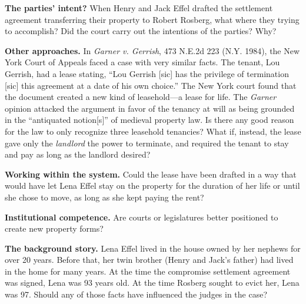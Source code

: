 
\item \textbf{The parties' intent?} When Henry and Jack Effel drafted the
settlement agreement transferring their property to Robert Rosberg, what where
they trying to accomplish?  Did the court carry out the intentions of the
parties?  Why?


\item \textbf{Other approaches.} In \textit{Garner v. Gerrish}, 473 N.E.2d 223
(N.Y. 1984), the New York Court of Appeals faced a case with very similar
facts.  The tenant, Lou Gerrish, had a lease stating, ``Lou Gerrish [sic] has
the privilege of termination [sic] this agreement at a date of his own
choice.''  The New York court found that the document created a new kind of
leasehold---a lease for life. The \textit{Garner} opinion attacked the argument
in favor of the tenancy at will as being grounded in the ``antiquated
notion[s]'' of medieval property law.  Is there any good reason for the law to
only recognize three leasehold tenancies?  What if, instead, the lease gave
only the \textit{landlord} the power to terminate, and required the tenant to
stay and pay as long as the landlord desired?


\item \textbf{Working within the system.} Could the lease have been drafted in a
way that would have let Lena Effel stay on the property for the duration of her
life or until she chose to move, as long as she kept paying the rent?


\item \textbf{Institutional competence.} Are courts or legislatures better
positioned to create new property forms?  


\item \textbf{The background story.} Lena Effel lived in the house owned by her
nephews for over 20 years.  Before that, her twin brother (Henry and Jack's
father) had lived in the home for many years.  At the time the compromise
settlement agreement was signed, Lena was 93 years old.  At the time Rosberg
sought to evict her, Lena was 97.  Should any of those facts have influenced
the judges in the case?

